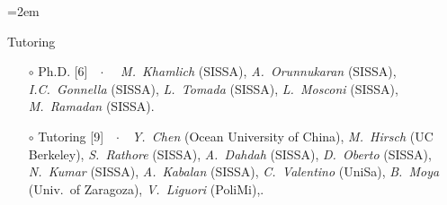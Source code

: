 \documentclass[
  usegeometry%
]{scrartcl}
\newcommand{\Description}[1]{\hangindent=2em\hangafter=0\noindent\raggedright\footnotesize{#1}\par\normalsize\vspace{1em}} %
\begin{document}
\begin{cv}{}
\Description{{\color{cyan} Tutoring}
\begin{itemize}
    \item[$\circ$] {\color{BrickRed}Ph.D.} [6]\ \ $\cdotp$\ \ \textit{ M.\ Khamlich} (SISSA), \textit{A.\ Orunnukaran} (SISSA),  \textit{I.C.\ Gonnella} (SISSA), \textit{ L.\ Tomada} (SISSA), \textit{L.\ Mosconi} (SISSA),  \textit{M.\ Ramadan} (SISSA).
    \item[$\circ$] {\color{orange}Tutoring} [9]\ \ $\cdotp$\ \ \textit{Y.\ Chen} (Ocean University of China), \textit{M.\ Hirsch} (UC Berkeley), \textit{S.\ Rathore} (SISSA), \textit{A.\ Dahdah} (SISSA), \textit{D.\ Oberto} (SISSA), \textit{N.\ Kumar} (SISSA), \textit{A.\ Kabalan} (SISSA), \textit{C.\ Valentino} (UniSa), \textit{B.\ Moya} (Univ.\ of Zaragoza), \textit{V.\ Liguori} (PoliMi),.

\end{itemize}}
\end{cv}
\end{document}
